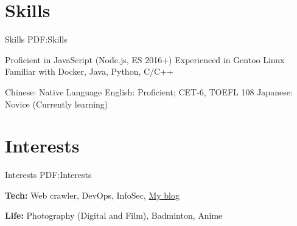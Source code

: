 \documentclass[a4paper,MMMyyyy,nonstop]{simpleresumecv}
\begin{document}
\begin{body}

\section
{Skills}
{Skills}
{PDF:Skills}

Proficient in JavaScript (Node.js, ES 2016+) \newline
Experienced in Gentoo Linux \newline
Familiar with Docker, Java, Python, C/C++

\Gap

Chinese: Native Language \newline
English: Proficient; CET-6, TOEFL 108 \newline
Japanese: Novice (Currently learning)


\section
{Interests}
{Interests}
{PDF:Interests}

\textbf{Tech: } Web crawler, DevOps, InfoSec, \href{https://wacky.one/}{My blog}

\textbf{Life: } Photography (Digital and Film), Badminton, Anime

\end{body}
\end{document}
